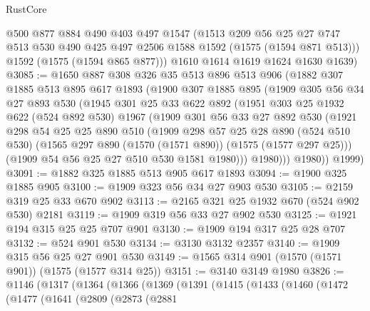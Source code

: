 \begin{lexlean}{RustCore}
\begin{coremodule}
        @500
        @877
        @884
        @490
        @403
        @497
        @1547
        (@1513
          @209
          @56
          @25
          @27
          @747
          @513
          @530
          @490
          @425
          @497
          @2506
          @1588
          @1592
          (@1575 (@1594 @871 @513)))
        @1592
        (@1575 (@1594 @865 @877)))
      @1610
      @1614
      @1619
      @1624
      @1630
      @1639)
@3085 := @1650
    @887
    @308
    @326
    @35
    @513
    @896
    @513
    @906
    (@1882
      @307
      @1885
      @513
      @895
      @617
      @1893
      (@1900
        @307
        @1885
        @895
        (@1909
          @305
          @56
          @34
          @27
          @893
          @530
          (@1945
            @301
            @25
            @33
            @622
            @892
            (@1951
              @303
              @25
              @1932
              @622
              (@524 @892 @530)
              @1967
              (@1909
                @301
                @56
                @33
                @27
                @892
                @530
                (@1921
                  @298
                  @54
                  @25
                  @25
                  @890
                  @510
                  (@1909
                    @298
                    @57
                    @25
                    @28
                    @890
                    (@524 @510 @530)
                    (@1565 @297 @890 (@1570 (@1571 @890)) (@1575 (@1577 @297 @25)))
                    (@1909 @54 @56 @25 @27 @510 @530 @1581 @1980)))
                @1980)))
          @1980))
      @1999)
@3091 := @1882 @325 @1885 @513 @905 @617 @1893
@3094 := @1900 @325 @1885 @905
@3100 := @1909 @323 @56 @34 @27 @903 @530
@3105 := @2159 @319 @25 @33 @670 @902
@3113 := @2165 @321 @25 @1932 @670 (@524 @902 @530) @2181
@3119 := @1909 @319 @56 @33 @27 @902 @530
@3125 := @1921 @194 @315 @25 @25 @707 @901
@3130 := @1909 @194 @317 @25 @28 @707
@3132 := @524 @901 @530
@3134 := @3130 @3132 @2357
@3140 := @1909 @315 @56 @25 @27 @901 @530
@3149 := @1565 @314 @901 (@1570 (@1571 @901)) (@1575 (@1577 @314 @25))
@3151 := @3140 @3149 @1980
@3826 := @1146
    (@1317
      (@1364
        (@1366
          (@1369
            (@1391
              (@1415
                (@1433
                  (@1460
                    (@1472
                      (@1477
                        (@1641
                          (@2809
                            (@2873
                              (@2881

\end{coremodule}
\end{lexlean}
